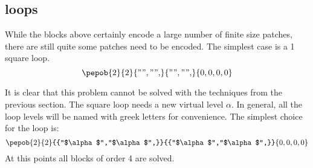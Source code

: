 \subsection{loops}

While the blocks above certainly encode a large number of finite size patches, there are still quite some patches need to be encoded. The simplest case is a 1 square loop.
\begin{equation}
    {\pepob{2}{2}{{"","",}}{{"","",}}{{0,0,0,0}}}
\end{equation}

It is clear that this problem cannot be solved with the techniques from the previous section. The square loop needs a new virtual level $\alpha$. In general, all the loop levels will be named with greek letters for convenience. The simplest choice for the loop is:
\begin{equation}
    {\pepob{2}{2}{{"$\alpha$","$\alpha$",}}{{"$\alpha$","$\alpha$",}}{{0,0,0,0}}}
\end{equation}
At this points all blocks of order 4 are solved.

